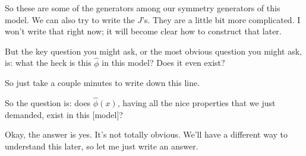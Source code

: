 So these are some of the generators among our symmetry generators of this model. We can also try to write the \(J\)'s. They are a little bit more complicated. I won't write that right now; it will become clear how to construct that later.


But the key question you might ask, or the most obvious question you might ask, is: what the heck is this \(\widehat\phi\) in this model? Does it even exist?


So just take a couple minutes to write down this line.


So the question is: does \(\widehat\phi(x)\), having all the nice properties that we just demanded, exist in this [model]?


Okay, the answer is yes. It's not totally obvious. We'll have a different way to understand this later, so let me just write an answer.

